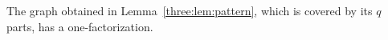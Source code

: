 \begin{proposition}\label{three:prop:terminal}
The graph obtained in Lemma~\ref{three:lem:pattern}, which is covered
by its $q$ parts, has a one-factorization.
\end{proposition}